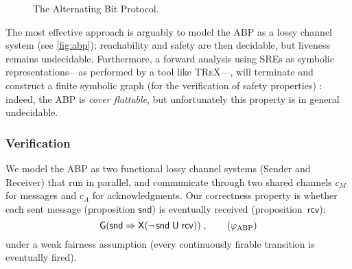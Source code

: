 \documentclass[11pt,reqno,a4paper]{amsart}
\theoremstyle{plain}
\theoremstyle{definition}
\theoremstyle{remark}
\renewcommand{\paragraph}{\subsubsection*}
\begin{document}
\begin{figure}[t!]
  \centering
  \caption{\label{fig:abp}The Alternating Bit Protocol.}
\end{figure}
The most effective approach is arguably to model the ABP as a lossy
channel system (see \autoref{fig:abp}); reachability and safety are then
decidable, but liveness remains undecidable.  Furthermore, a forward
analysis using SREs as symbolic representations---as performed by a tool
like \textsc{TReX}---, will terminate and construct a finite symbolic graph (for
the verification of safety properties) \citep{fwlcs}: indeed, the ABP is
\emph{cover flattable}, but unfortunately this property is in general
undecidable.

\paragraph{Verification}
We model the ABP as two functional lossy channel systems (Sender and
Receiver) that run in parallel, and communicate through two shared
channels $c_M$ for messages and $c_A$ for acknowledgments.  Our
correctness property is whether each sent message (proposition
$\mathsf{snd}$) is eventually received (proposition~$\mathsf{rcv}$):
\begin{equation}\label{eq:liveabp}
  \mathsf{G}(\mathsf{snd}\Rightarrow\mathsf{X}(\neg\,\mathsf{snd}\mathrel{\mathsf{U}}\mathsf{rcv}))\;,\tag{$\varphi_\text{ABP}$}
\end{equation}
under a weak fairness assumption (every continuously firable transition
is eventually fired).
\end{document}
